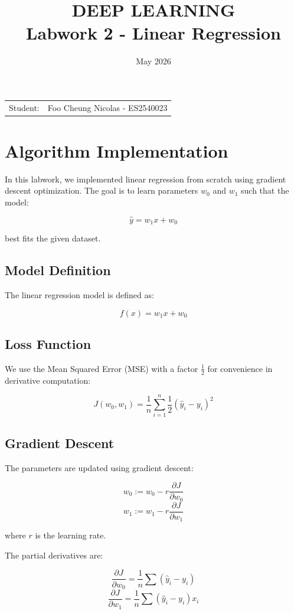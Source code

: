 \documentclass{article}
\title{\textbf{DEEP LEARNING} \\ 
{\Large \textbf{Labwork 2 - Linear Regression}}}
\date{May 2026}
\begin{document}
\pagestyle{plain}
\maketitle

\noindent\begin{tabular}{@{}ll}
    Student: & Foo Cheung Nicolas - ES2540023\\
\end{tabular}

\section{Algorithm Implementation}

In this labwork, we implemented linear regression from scratch using gradient descent optimization. The goal is to learn parameters $w_0$ and $w_1$ such that the model:

\[
\hat{y} = w_1 x + w_0
\]

best fits the given dataset.


\subsection{Model Definition}

The linear regression model is defined as:

\[
f(x) = w_1 x + w_0
\]

\subsection{Loss Function}

We use the Mean Squared Error (MSE) with a factor $\frac{1}{2}$ for convenience in derivative computation:

\[
J(w_0, w_1) = \frac{1}{n} \sum_{i=1}^{n} \frac{1}{2} (\hat{y}_i - y_i)^2
\]

\subsection{Gradient Descent}

The parameters are updated using gradient descent:

\[
w_0 := w_0 - r \frac{\partial J}{\partial w_0}
\]
\[
w_1 := w_1 - r \frac{\partial J}{\partial w_1}
\]

where $r$ is the learning rate.

The partial derivatives are:

\[
\frac{\partial J}{\partial w_0} = \frac{1}{n} \sum (\hat{y}_i - y_i)
\]
\[
\frac{\partial J}{\partial w_1} = \frac{1}{n} \sum (\hat{y}_i - y_i)x_i
\]
\end{document}
